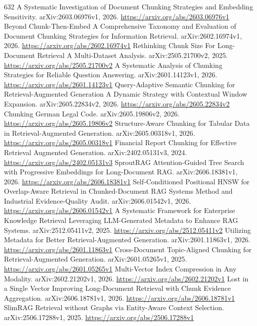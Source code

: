 \documentclass[11pt]{article}
\begin{document}
\begin{thebibliography}{632}
 A Systematic Investigation of Document Chunking Strategies and Embedding Sensitivity. arXiv:2603.06976v1, 2026. \url{https://arxiv.org/abs/2603.06976v1}
 Beyond Chunk-Then-Embed A Comprehensive Taxonomy and Evaluation of Document Chunking Strategies for Information Retrieval. arXiv:2602.16974v1, 2026. \url{https://arxiv.org/abs/2602.16974v1}
 Rethinking Chunk Size For Long-Document Retrieval A Multi-Dataset Analysis. arXiv:2505.21700v2, 2025. \url{https://arxiv.org/abs/2505.21700v2}
 A Systematic Analysis of Chunking Strategies for Reliable Question Answering. arXiv:2601.14123v1, 2026. \url{https://arxiv.org/abs/2601.14123v1}
 Query-Adaptive Semantic Chunking for Retrieval-Augmented Generation A Dynamic Strategy with Contextual Window Expansion. arXiv:2605.22834v2, 2026. \url{https://arxiv.org/abs/2605.22834v2}
 Chunking German Legal Code. arXiv:2605.19806v2, 2026. \url{https://arxiv.org/abs/2605.19806v2}
 Structure-Aware Chunking for Tabular Data in Retrieval-Augmented Generation. arXiv:2605.00318v1, 2026. \url{https://arxiv.org/abs/2605.00318v1}
 Financial Report Chunking for Effective Retrieval Augmented Generation. arXiv:2402.05131v3, 2024. \url{https://arxiv.org/abs/2402.05131v3}
 SproutRAG Attention-Guided Tree Search with Progressive Embeddings for Long-Document RAG. arXiv:2606.18381v1, 2026. \url{https://arxiv.org/abs/2606.18381v1}
 Self-Conditioned Positional HNSW for Overlap-Aware Retrieval in Chunked-Document RAG Systems Method and Industrial Evidence-Quality Audit. arXiv:2606.01542v1, 2026. \url{https://arxiv.org/abs/2606.01542v1}
 A Systematic Framework for Enterprise Knowledge Retrieval Leveraging LLM-Generated Metadata to Enhance RAG Systems. arXiv:2512.05411v2, 2025. \url{https://arxiv.org/abs/2512.05411v2}
 Utilizing Metadata for Better Retrieval-Augmented Generation. arXiv:2601.11863v1, 2026. \url{https://arxiv.org/abs/2601.11863v1}
 Cross-Document Topic-Aligned Chunking for Retrieval-Augmented Generation. arXiv:2601.05265v1, 2025. \url{https://arxiv.org/abs/2601.05265v1}
 Multi-Vector Index Compression in Any Modality. arXiv:2602.21202v1, 2026. \url{https://arxiv.org/abs/2602.21202v1}
 Lost in a Single Vector Improving Long-Document Retrieval with Chunk Evidence Aggregation. arXiv:2606.18781v1, 2026. \url{https://arxiv.org/abs/2606.18781v1}
 SlimRAG Retrieval without Graphs via Entity-Aware Context Selection. arXiv:2506.17288v1, 2025. \url{https://arxiv.org/abs/2506.17288v1}

\end{thebibliography}
\end{document}
